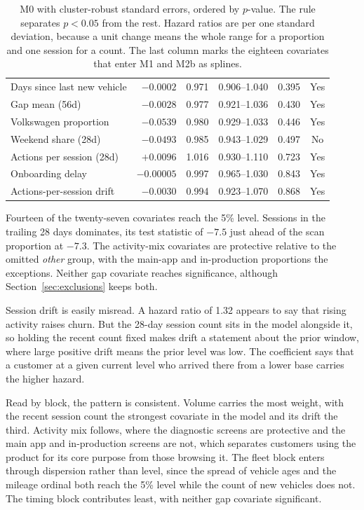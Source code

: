 \begin{table}[htbp]
\begin{tabular}{@{}lrrrrc@{}}
Days since last new vehicle  & $-0.0002$ & 0.971 & 0.906--1.040 & 0.395 & Yes \\
Gap mean (56d)               & $-0.0028$ & 0.977 & 0.921--1.036 & 0.430 & Yes \\
Volkswagen proportion        & $-0.0539$ & 0.980 & 0.929--1.033 & 0.446 & Yes \\
Weekend share (28d)          & $-0.0493$ & 0.985 & 0.943--1.029 & 0.497 & No \\
Actions per session (28d)    & $+0.0096$ & 1.016 & 0.930--1.110 & 0.723 & Yes \\
Onboarding delay             & $-0.00005$ & 0.997 & 0.965--1.030 & 0.843 & Yes \\
Actions-per-session drift    & $-0.0030$ & 0.994 & 0.923--1.070 & 0.868 & Yes \\
\bottomrule
\end{tabular}
\caption{M0 with cluster-robust standard errors, ordered by $p$-value. The rule separates $p<0.05$ from the rest. Hazard ratios are per one standard deviation, because a unit change means the whole range for a proportion and one session for a count. The last column marks the eighteen covariates that enter M1 and M2b as splines.}
\label{tab:coefficients}
\end{table}
 
Fourteen of the twenty-seven covariates reach the 5\% level. Sessions in the trailing 28 days dominates, its test statistic of $-7.5$ just ahead of the scan proportion at $-7.3$. The activity-mix covariates are protective relative to the omitted \emph{other} group, with the main-app and in-production proportions the exceptions. Neither gap covariate reaches significance, although Section~\ref{sec:exclusions} keeps both.
 
Session drift is easily misread. A hazard ratio of 1.32 appears to say that rising activity raises churn. But the 28-day session count sits in the model alongside it, so holding the recent count fixed makes drift a statement about the prior window, where large positive drift means the prior level was low. The coefficient says that a customer at a given current level who arrived there from a lower base carries the higher hazard.
 
Read by block, the pattern is consistent. Volume carries the most weight, with the recent session count the strongest covariate in the model and its drift the third. Activity mix follows, where the diagnostic screens are protective and the main app and in-production screens are not, which separates customers using the product for its core purpose from those browsing it. The fleet block enters through dispersion rather than level, since the spread of vehicle ages and the mileage ordinal both reach the 5\% level while the count of new vehicles does not. The timing block contributes least, with neither gap covariate significant.
 
